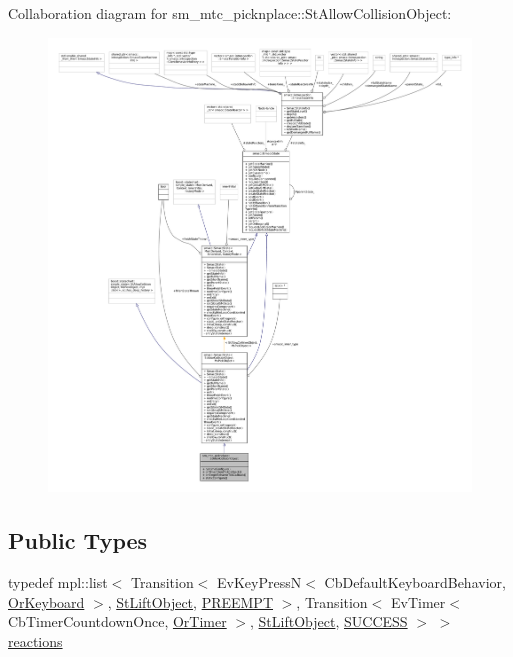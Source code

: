 Collaboration diagram for sm\+\_\+mtc\+\_\+picknplace\+:\+:St\+Allow\+Collision\+Object\+:
\nopagebreak
\begin{figure}[H]
\begin{center}
\leavevmode
\includegraphics[width=350pt]{structsm__mtc__picknplace_1_1StAllowCollisionObject__coll__graph}
\end{center}
\end{figure}
\subsection*{Public Types}
\begin{DoxyCompactItemize}
\item 
typedef mpl\+::list$<$ Transition$<$ Ev\+Key\+PressN$<$ Cb\+Default\+Keyboard\+Behavior, \hyperlink{classsm__mtc__picknplace_1_1OrKeyboard}{Or\+Keyboard} $>$, \hyperlink{structsm__mtc__picknplace_1_1StLiftObject}{St\+Lift\+Object}, \hyperlink{classPREEMPT}{P\+R\+E\+E\+M\+PT} $>$, Transition$<$ Ev\+Timer$<$ Cb\+Timer\+Countdown\+Once, \hyperlink{classsm__mtc__picknplace_1_1OrTimer}{Or\+Timer} $>$, \hyperlink{structsm__mtc__picknplace_1_1StLiftObject}{St\+Lift\+Object}, \hyperlink{classSUCCESS}{S\+U\+C\+C\+E\+SS} $>$ $>$ \hyperlink{structsm__mtc__picknplace_1_1StAllowCollisionObject_a0e9e198807fa251f6207b947b08dbbcc}{reactions}
\end{DoxyCompactItemize}
